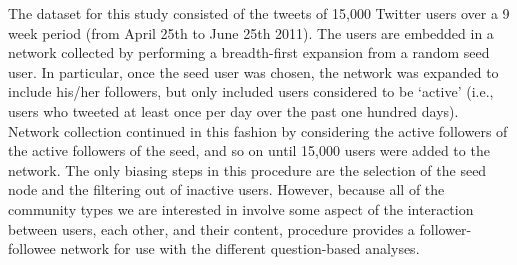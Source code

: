 The dataset for this study consisted of the tweets of 15,000 Twitter users over a 9 week period (from April 25th to June 25th 2011). The users are embedded in a network collected by performing a breadth-first expansion from a random seed user. In particular, once the seed user was chosen, the network was expanded to include his/her followers, but only included users considered to be `active' (i.e., users who tweeted at least once per day over the past one hundred days). Network collection continued in this fashion by considering the active followers of the active followers of the seed, and so on until 15,000 users were added to the network. The only biasing steps in this procedure are the selection of the seed node and the filtering out of inactive users. However, because all of the community types we are interested in involve some aspect of the interaction between users, each other, and their content, \DIFdelbegin {}\DIFdelend \DIFaddbegin {}\DIFaddend procedure provides a \DIFdelbegin {}\DIFdelend \DIFaddbegin {}\DIFaddend follower-followee network for use with the different question-based analyses.

